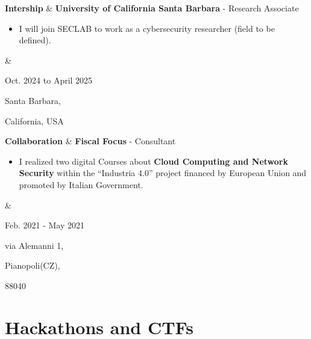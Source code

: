 \documentclass[10pt, letterpaper]{article}
\newenvironment{highlights}{
        \begin{itemize}[
                topsep=0pt,
                parsep=0.10 cm,
                partopsep=0pt,
                itemsep=0pt,
                after=\vspace{-1\baselineskip},
                leftmargin=0.4 cm + 3pt
            ]
    }{
        \end{itemize}
    } %
\let\originalTabularx\tabularx
\let\originalEndTabularx\endtabularx
\renewenvironment{tabularx}{\bgroup\centering\originalTabularx}{\originalEndTabularx\par\egroup}
\begin{document}
    
        
\begin{tabularx}{
    \textwidth-0.4 cm-0.13cm
}{
    L{2cm}
    K{0.85 cm}
    R{4.1 cm}
}
    \textbf{Intership}
    &
    \textbf{University of California Santa Barbara} - Research Associate 

    \vspace{0.20 cm}

    \begin{highlights}
    \item[] I will join SECLAB to work as a cybersecurity researcher (field to be defined).
    \end{highlights}
    &

    Oct. 2024 to April 2025

    Santa Barbara, 

    California, USA
\end{tabularx}     

\begin{tabularx}{
    \textwidth-0.4 cm-0.13cm
}{
    L{2cm}
    K{0.85 cm}
    R{4.1 cm}
}
    \textbf{Collaboration}
    &
    \textbf{Fiscal Focus} - Consultant

    \vspace{0.20 cm}

    \begin{highlights}
    \item[] I realized two digital Courses about\textbf{ Cloud Computing and Network Security} within the “Industria 4.0” project financed by European Union and promoted by Italian Government.
    \end{highlights}
    &

    Feb. 2021 - May 2021

    via Alemanni 1,
    
    Pianopoli(CZ), 
    
    88040
\end{tabularx}     


    \section{Hackathons and CTFs}
\end{document}
